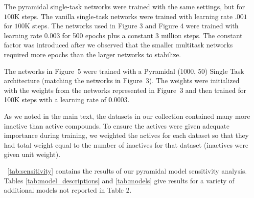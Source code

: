 The pyramidal single-task networks were trained with the same settings, but
for $100$K steps. The vanilla single-task networks were trained with
learning rate $.001$ for $100$K steps. The networks used in Figure 3 and
Figure 4 were trained with learning rate $0.003$ for 500 epochs plus a
constant 3 million steps. The constant factor was introduced after we
observed that the smaller multitask networks required more epochs than the
larger networks to stabilize.

The networks in Figure~5 were trained with a Pyramidal (1000, 50) Single
Task architecture (matching the networks in Figure~3). The weights were
initialized with the weights from the networks represented in Figure~3 and
then trained for 100K steps with a learning rate of 0.0003.

As we noted in the main text, the datasets in our collection contained many
more inactive than active compounds. To ensure the actives were given
adequate importance during training, we weighted the actives for each
dataset so that they had total weight equal to the number of inactives for
that dataset (inactives were given unit weight).

\tablename~\ref{tab:sensitivity} contains the results of our pyramidal
model sensitivity analysis.  Tables \ref{tab:model_descriptions} and
\ref{tab:models} give results for a variety of additional models not
reported in Table 2.

\begin{table}[ht]
\centering
\caption{Pyramid sensitivity analysis. Median 5-fold-average-AUC values are
  given for several variations of the pyramidal architecture. In an attempt
  to avoid the problem of training failures due to the top layer becoming all
  zero early in the training, the learning rate was set to 0.0001 for the
  first 2M steps then to 0.0003 for 28M steps.}
\label{tab:sensitivity}
\vskip 0.2in
\end{table}


